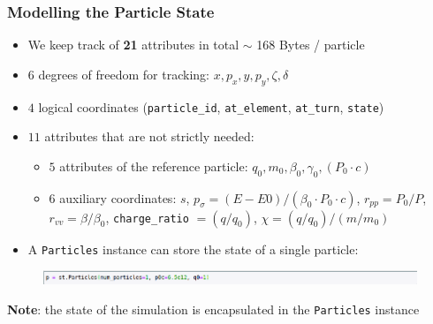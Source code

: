 \documentclass{beamer}
\begin{document}
\begin{frame}[fragile]
\frametitle{Modelling the Particle State}
    \begin{itemize}
    \item We keep track of \textbf{21} attributes in total $\sim$ 168 Bytes / particle
    \item $6$ degrees of freedom for tracking: $x, p_x, y, p_y, \zeta, \delta$
    \item $4$ logical coordinates (\texttt{particle\_id},         
            \texttt{at\_element}, \texttt{at\_turn}, \texttt{state})
    \item $11$ attributes that are not strictly needed:
        \begin{itemize}
            \item $5$ attributes of the reference particle: 
                  $q_0, m_0, \beta_0, \gamma_0, (P_0 \cdot c)$
            \item $6$ auxiliary coordinates:
                  $s$, $p_\sigma = (E-E0)/(\beta_0 \cdot P_0 \cdot c)$, 
                  $r_{pp}=P_0/P$, $r_{vv}=\beta/\beta_0$, 
                  \texttt{charge\_ratio} $=(q/q_0)$, $\chi=(q/q_0)/(m/m_0)$
        \end{itemize}
    \item A \texttt{Particles} instance can store the state of a single particle:
    \end{itemize}
    \begin{figure}[h]
            \centering
            \includegraphics[width=\textwidth]{images/particle_state_01.png}
    \end{figure}
    \item \textbf{Note}: the state of the simulation is encapsulated in the \texttt{Particles} instance
\end{frame}
\end{document}
